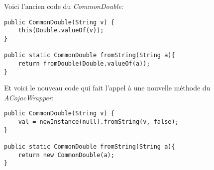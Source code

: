 Voici l'ancien code du \textit{CommonDouble}:

\begin{verbatim}
public CommonDouble(String v) {
    this(Double.valueOf(v));
}

public static CommonDouble fromString(String a){
    return fromDouble(Double.valueOf(a));
}
\end{verbatim}

\begin{minipage2}
Et voici le nouveau code qui fait l'appel à une nouvelle méthode du \textit{ACojacWrapper}:

\begin{verbatim}
public CommonDouble(String v) {
    val = newInstance(null).fromString(v, false);
}

public static CommonDouble fromString(String a){
    return new CommonDouble(a);
}
\end{verbatim}
\end{minipage2}
